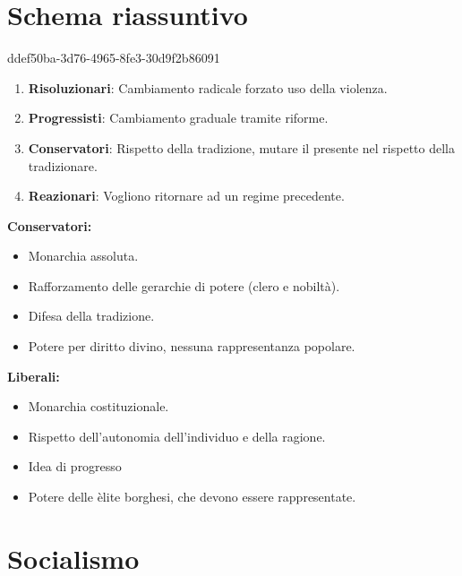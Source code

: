 \documentclass[preview]{standalone}
\begin{document}
\section{Schema riassuntivo}

\begin{snippet}{ddef50ba-3d76-4965-8fe3-30d9f2b86091}
    \begin{enumerate}
        \item \textbf{Risoluzionari}: Cambiamento radicale forzato uso della violenza.
        \item \textbf{Progressisti}: Cambiamento graduale tramite riforme.
        \item \textbf{Conservatori}: Rispetto della tradizione, mutare il presente nel rispetto della tradizionare.
        \item \textbf{Reazionari}: Vogliono ritornare ad un regime precedente.
    \end{enumerate}
    
    \textbf{Conservatori:}
    \begin{itemize}
        \item Monarchia assoluta.
        \item Rafforzamento delle gerarchie di potere (clero e nobiltà).
        \item Difesa della tradizione.
        \item Potere per diritto divino, nessuna rappresentanza popolare.
    \end{itemize}
    
    \textbf{Liberali:}
    \begin{itemize}
        \item Monarchia costituzionale.
        \item Rispetto dell'autonomia dell'individuo e della ragione.
        \item Idea di progresso
        \item Potere delle èlite borghesi, che devono essere rappresentate.
    \end{itemize}
\end{snippet}

\section{Socialismo}
\end{document}
